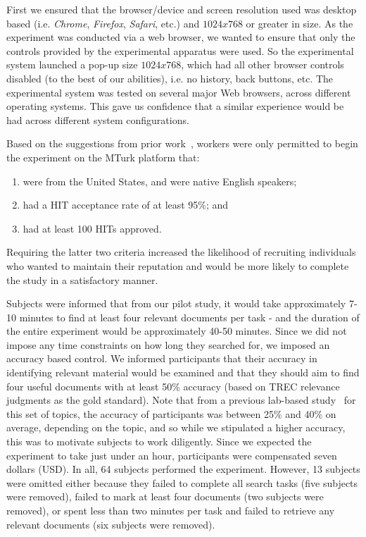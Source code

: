 First we ensured that the browser/device and screen resolution used was desktop based (i.e. \emph{Chrome}, \emph{Firefox}, \emph{Safari}, etc.) and $1024x768$ or greater in size. As the experiment was conducted via a web browser, we wanted to ensure that only the controls provided by the experimental apparatus were used. So the experimental system launched a pop-up size $1024x768$, which had all other browser controls disabled (to the best of our abilities), i.e. no history, back buttons, etc. The experimental system was tested on several major Web browsers, across different operating systems. This gave us confidence that a similar experience would be had across different system configurations.

Based on the suggestions from prior work~\cite{feild2010turkers,zuccon2013crowdsourcing,bota2016playing_your_cards}, workers were only permitted to begin the experiment on the MTurk platform that: 
\begin{enumerate}
\item were from the United States, and were native English speakers;
\item had a HIT acceptance rate of at least 95\%; and 
\item had at least 100 HITs approved.
\end{enumerate}
Requiring the latter two criteria increased the likelihood of recruiting individuals who wanted to maintain their reputation and would be more likely to complete the study in a satisfactory manner. 

Subjects were informed that from our pilot study, it would take approximately 7-10 minutes to find at least four relevant documents per task - and the duration of the entire experiment would be approximately 40-50 minutes. Since we did not impose any time constraints on how long they searched for, we imposed an accuracy based control. We informed participants that their accuracy in identifying relevant material would be examined and that they should aim to find four useful documents with at least 50\% accuracy (based on TREC relevance judgments as the gold standard). Note that from a previous lab-based study~\cite{maxwell2017snippet_length} for this set of topics, the accuracy of participants was between 25\% and 40\% on average, depending on the topic, and so while we stipulated a higher accuracy, this was to motivate subjects to work diligently. Since we expected the experiment to take just under an hour, participants were compensated seven dollars (USD). In all, 64 subjects performed the experiment. However, 13 subjects were omitted either because they failed to complete all search tasks (five subjects were removed), failed to mark at least four documents (two subjects were removed), or spent less than two minutes per task and failed to retrieve any relevant documents (six subjects were removed). 

